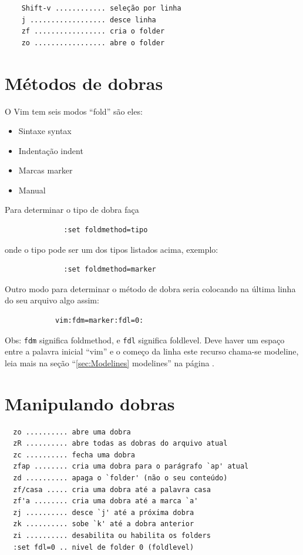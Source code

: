 \documentclass[10pt,a4paper,openany]{book}
\begin{document}
\begin{verbatim}
	Shift-v ............ seleção por linha
	j .................. desce linha
	zf ................. cria o folder
	zo ................. abre o folder
\end{verbatim}

\section{Métodos de dobras }
\label{Métodos de dobras }
O Vim tem seis modos ``fold'' são eles:

\begin{itemize}
\item Sintaxe syntax
\item Indentação indent
\item Marcas marker
\item Manual
\end{itemize}

Para determinar o tipo de dobra faça

\begin{verbatim}
			  :set foldmethod=tipo
\end{verbatim}

onde o tipo pode ser um dos tipos listados acima, exemplo:

\begin{verbatim}
			  :set foldmethod=marker
\end{verbatim}

Outro modo para determinar o método de dobra seria colocando na última
linha do seu arquivo algo assim:

\begin{verbatim}
			vim:fdm=marker:fdl=0:
\end{verbatim}

Obs: \verb|fdm| significa foldmethod, e \verb|fdl| significa
foldlevel. Deve haver um espaço entre a palavra inicial ``vim'' e o
começo da linha este recurso chama-se modeline, leia mais na seção
``\ref{sec:Modelines} modelines'' na página \pageref{sec:Modelines}.

\section{Manipulando dobras }\label{Manipulando dobras }

\begin{verbatim}
  zo .......... abre uma dobra
  zR .......... abre todas as dobras do arquivo atual
  zc .......... fecha uma dobra
  zfap ........ cria uma dobra para o parágrafo `ap' atual
  zd .......... apaga o `folder' (não o seu conteúdo)
  zf/casa ..... cria uma dobra até a palavra casa
  zf'a ........ cria uma dobra até a marca `a'
  zj .......... desce `j' até a próxima dobra
  zk .......... sobe `k' até a dobra anterior
  zi .......... desabilita ou habilita os folders
  :set fdl=0 .. nivel de folder 0 (foldlevel)
\end{verbatim}
\end{document}
